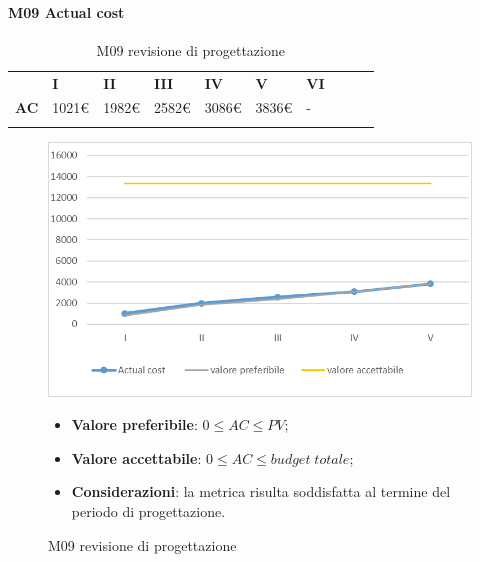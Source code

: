 \paragraph{M09 Actual cost} \mbox{}
\begin{longtable}[H!] {						
		>{}p{38mm}  		
		>{}p{12mm}
		>{}p{12mm}		
		>{}p{12mm}		
		>{}p{12mm}		
		>{}p{12mm}		
		>{}p{12mm}
		>{}p{12mm}
		>{}p{12mm}
		>{}p{12mm}
	}
	\rowcolor{gray!50}
	\textbf{} & \textbf{I} & \textbf{II} & \textbf{III} & \textbf{IV} & \textbf{V} & \textbf{VI} \TBstrut \\ [2mm]
	\textbf{AC} & 1021\euro & 1982\euro & 2582\euro & 3086\euro & 3836\euro & - \TBstrut \\ [2mm]
	\rowcolor{white}
	\caption{M09 revisione di progettazione}
\end{longtable}
\begin{figure}[H] 	
\includegraphics[width=\linewidth]{./img/grafici/RP6.png}	
\caption{M09 revisione di progettazione}	
\begin{itemize}
	\item \textbf{Valore preferibile}: $0\le AC \le PV$;
	\item \textbf{Valore accettabile}: $0 \le AC \le budget \; totale$;
	\item \textbf{Considerazioni}: la metrica risulta soddisfatta al termine del periodo di progettazione.
\end{itemize}
\end{figure}
